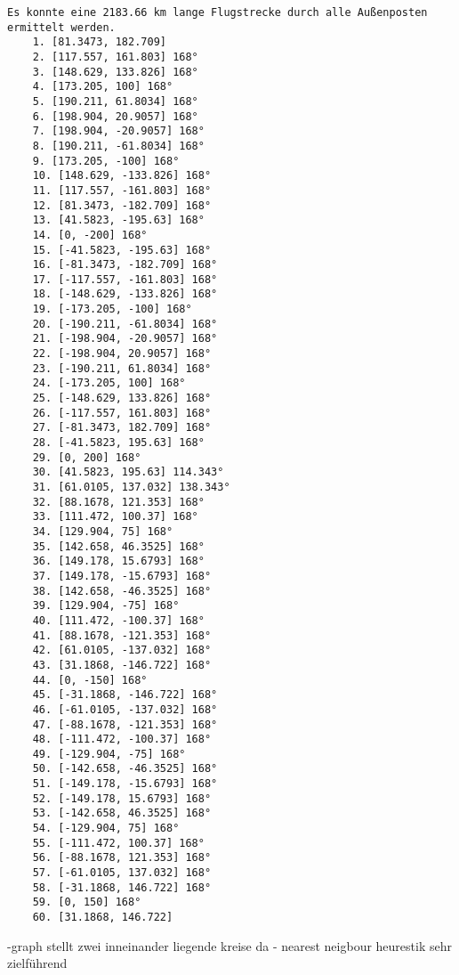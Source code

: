 \documentclass[a4paper,10pt,ngerman]{scrartcl}
\begin{document}
    \begin{lstlisting}[frame=single, title=Programmausgabe wenigerkrumm2.txt, breaklines=true,label={lst:lstlisting4}]
    Es konnte eine 2183.66 km lange Flugstrecke durch alle Außenposten ermittelt werden.
    1. [81.3473, 182.709]
    2. [117.557, 161.803] 168°
    3. [148.629, 133.826] 168°
    4. [173.205, 100] 168°
    5. [190.211, 61.8034] 168°
    6. [198.904, 20.9057] 168°
    7. [198.904, -20.9057] 168°
    8. [190.211, -61.8034] 168°
    9. [173.205, -100] 168°
    10. [148.629, -133.826] 168°
    11. [117.557, -161.803] 168°
    12. [81.3473, -182.709] 168°
    13. [41.5823, -195.63] 168°
    14. [0, -200] 168°
    15. [-41.5823, -195.63] 168°
    16. [-81.3473, -182.709] 168°
    17. [-117.557, -161.803] 168°
    18. [-148.629, -133.826] 168°
    19. [-173.205, -100] 168°
    20. [-190.211, -61.8034] 168°
    21. [-198.904, -20.9057] 168°
    22. [-198.904, 20.9057] 168°
    23. [-190.211, 61.8034] 168°
    24. [-173.205, 100] 168°
    25. [-148.629, 133.826] 168°
    26. [-117.557, 161.803] 168°
    27. [-81.3473, 182.709] 168°
    28. [-41.5823, 195.63] 168°
    29. [0, 200] 168°
    30. [41.5823, 195.63] 114.343°
    31. [61.0105, 137.032] 138.343°
    32. [88.1678, 121.353] 168°
    33. [111.472, 100.37] 168°
    34. [129.904, 75] 168°
    35. [142.658, 46.3525] 168°
    36. [149.178, 15.6793] 168°
    37. [149.178, -15.6793] 168°
    38. [142.658, -46.3525] 168°
    39. [129.904, -75] 168°
    40. [111.472, -100.37] 168°
    41. [88.1678, -121.353] 168°
    42. [61.0105, -137.032] 168°
    43. [31.1868, -146.722] 168°
    44. [0, -150] 168°
    45. [-31.1868, -146.722] 168°
    46. [-61.0105, -137.032] 168°
    47. [-88.1678, -121.353] 168°
    48. [-111.472, -100.37] 168°
    49. [-129.904, -75] 168°
    50. [-142.658, -46.3525] 168°
    51. [-149.178, -15.6793] 168°
    52. [-149.178, 15.6793] 168°
    53. [-142.658, 46.3525] 168°
    54. [-129.904, 75] 168°
    55. [-111.472, 100.37] 168°
    56. [-88.1678, 121.353] 168°
    57. [-61.0105, 137.032] 168°
    58. [-31.1868, 146.722] 168°
    59. [0, 150] 168°
    60. [31.1868, 146.722]
    \end{lstlisting}

    -graph stellt zwei inneinander liegende kreise da
    - nearest neigbour heurestik sehr zielführend
\end{document}
